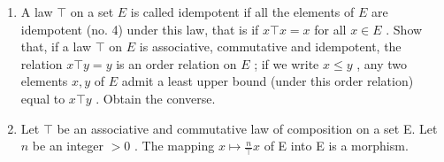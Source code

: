 \begin{enumerate}
  Show that under the law of composition \(f \circ g\) between mappings of E into E the centre consists of the identity mapping.
\item
  A law \(\top\) on a set \(E\) is called idempotent if all the elements of \(E\) are idempotent (no. 4) under this law, that is if \(x \top x = x\) for all \(x \in E\) . Show that, if a law \(\top\) on \(E\) is associative, commutative and idempotent, the relation \(x \top y = y\) is an order relation on \(E\) ; if we write \(x \leqslant y\) , any two elements \(x, y\) of \(E\) admit a least upper bound (under this order relation) equal to \(x \top y\) . Obtain the converse.
\item
  Let \(\top\) be an associative and commutative law of composition on a set E. Let \(n\) be an integer \(>0\) . The mapping \(x \mapsto \frac{n}{\top} x\) of E into E is a morphism.
\end{enumerate}

